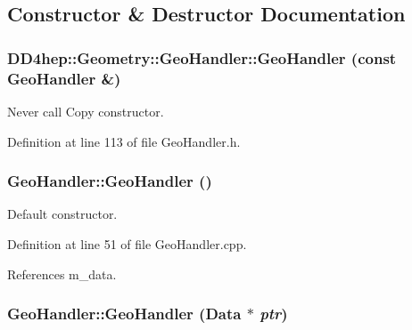 \subsection{Constructor \& Destructor Documentation}
\hypertarget{class_d_d4hep_1_1_geometry_1_1_geo_handler_acade5475bb3291d079f7eda3daded0e7}{
\subsubsection[{GeoHandler}]{\setlength{\rightskip}{0pt plus 5cm}DD4hep::Geometry::GeoHandler::GeoHandler (const {\bf GeoHandler} \&)}}
\label{class_d_d4hep_1_1_geometry_1_1_geo_handler_acade5475bb3291d079f7eda3daded0e7}


Never call Copy constructor. 

Definition at line 113 of file GeoHandler.h.\hypertarget{class_d_d4hep_1_1_geometry_1_1_geo_handler_abbce30079f47cd87244d2d5ac2e301e4}{
\subsubsection[{GeoHandler}]{\setlength{\rightskip}{0pt plus 5cm}GeoHandler::GeoHandler ()}}
\label{class_d_d4hep_1_1_geometry_1_1_geo_handler_abbce30079f47cd87244d2d5ac2e301e4}


Default constructor. 

Definition at line 51 of file GeoHandler.cpp.

References m\_\-data.\hypertarget{class_d_d4hep_1_1_geometry_1_1_geo_handler_a247d32d9a08a552eb6716c573c062eb1}{
\subsubsection[{GeoHandler}]{\setlength{\rightskip}{0pt plus 5cm}GeoHandler::GeoHandler ({\bf Data} $\ast$ {\em ptr})}}
\label{class_d_d4hep_1_1_geometry_1_1_geo_handler_a247d32d9a08a552eb6716c573c062eb1}


